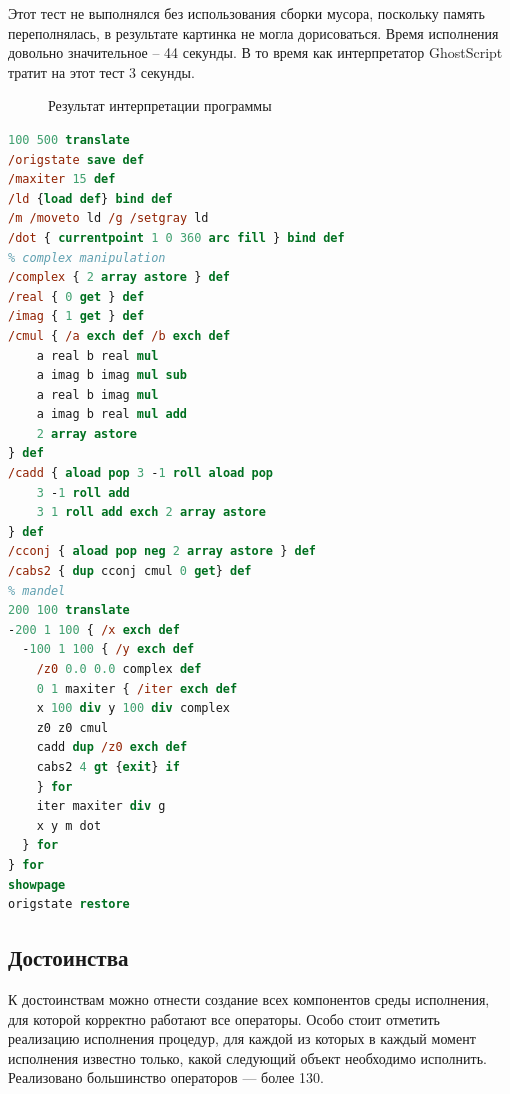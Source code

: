 \documentclass[14pt]{extarticle}
\begin{document}
Этот тест не выполнялся без использования сборки мусора, поскольку память переполнялась, в результате картинка не могла дорисоваться. Время исполнения  довольно значительное -- 44 секунды. В то время как интерпретатор GhostScript тратит на этот тест 3 секунды.

\begin{figure} [h]
\caption{Результат интерпретации программы}\label{mandelprotset}
\end{figure}

\begin{lstlisting}[label=mandel_ps,caption=Множество Мандельброта, frame = none, language = PostScript]
100 500 translate
/origstate save def
/maxiter 15 def
/ld {load def} bind def
/m /moveto ld /g /setgray ld
/dot { currentpoint 1 0 360 arc fill } bind def
% complex manipulation
/complex { 2 array astore } def
/real { 0 get } def
/imag { 1 get } def
/cmul { /a exch def /b exch def
    a real b real mul
    a imag b imag mul sub
    a real b imag mul
    a imag b real mul add
    2 array astore
} def
/cadd { aload pop 3 -1 roll aload pop
    3 -1 roll add
    3 1 roll add exch 2 array astore
} def
/cconj { aload pop neg 2 array astore } def
/cabs2 { dup cconj cmul 0 get} def
% mandel
200 100 translate
-200 1 100 { /x exch def
  -100 1 100 { /y exch def
    /z0 0.0 0.0 complex def
    0 1 maxiter { /iter exch def
	x 100 div y 100 div complex
	z0 z0 cmul
	cadd dup /z0 exch def
	cabs2 4 gt {exit} if
    } for
    iter maxiter div g
    x y m dot
  } for
} for
showpage
origstate restore
\end{lstlisting}

\subsection{Достоинства}
К достоинствам можно отнести создание всех компонентов среды исполнения, для которой корректно работают все операторы. Особо стоит отметить реализацию исполнения процедур, для каждой из которых в каждый момент исполнения известно только, какой следующий объект необходимо исполнить. Реализовано большинство операторов  --- более 130.
\end{document}
